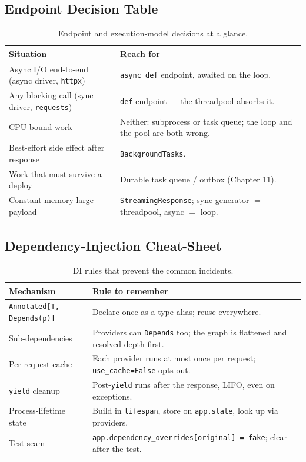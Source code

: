\subsection*{Endpoint Decision Table}
\begin{table}[h]
  \centering
  \small
  \begin{tabularx}{\textwidth}{l X}
    \toprule
    \textbf{Situation} & \textbf{Reach for} \\
    \midrule
    Async I/O end-to-end (async driver, \texttt{httpx}) & \texttt{async def} endpoint, awaited on the loop. \\
    Any blocking call (sync driver, \texttt{requests}) & \texttt{def} endpoint --- the threadpool absorbs it. \\
    CPU-bound work & Neither: subprocess or task queue; the loop and the pool are both wrong. \\
    Best-effort side effect after response & \texttt{BackgroundTasks}. \\
    Work that must survive a deploy & Durable task queue / outbox (Chapter 11). \\
    Constant-memory large payload & \texttt{StreamingResponse}; sync generator $=$ threadpool, async $=$ loop. \\
    \bottomrule
  \end{tabularx}
  \caption{Endpoint and execution-model decisions at a glance.}
\end{table}

\subsection*{Dependency-Injection Cheat-Sheet}
\begin{table}[h]
  \centering
  \small
  \begin{tabularx}{\textwidth}{l X}
    \toprule
    \textbf{Mechanism} & \textbf{Rule to remember} \\
    \midrule
    \texttt{Annotated[T, Depends(p)]} & Declare once as a type alias; reuse everywhere. \\
    Sub-dependencies & Providers can \texttt{Depends} too; the graph is flattened and resolved depth-first. \\
    Per-request cache & Each provider runs at most once per request; \texttt{use\_cache=False} opts out. \\
    \texttt{yield} cleanup & Post-\texttt{yield} runs after the response, LIFO, even on exceptions. \\
    Process-lifetime state & Build in \texttt{lifespan}, store on \texttt{app.state}, look up via providers. \\
    Test seam & \texttt{app.dependency\_overrides[original] = fake}; clear after the test. \\
    \bottomrule
  \end{tabularx}
  \caption{DI rules that prevent the common incidents.}
\end{table}

